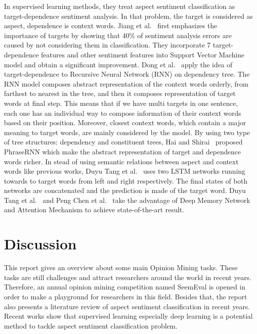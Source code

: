 \documentclass{article}
\begin{document}
In supervised learning methods, they treat aspect sentiment classification as target-dependence sentiment analysis.
In that problem, the target is considered as aspect, dependence is context words.
Jiang et al.~\cite{Jiang:2011:TTS:2002472.2002492} first emphasizes the importance of targets by showing that 40\% of sentiment analysis errors are caused by not considering them in classification.
They incorporate 7 target-dependence features and other sentiment features into Support Vector Machine model and obtain a significant improvement.
Dong et al.~\cite{dong2014adaptive} apply the idea of target-dependence to Recursive Neural Network (RNN) on dependency tree.
The RNN model composes abstract representation of the context words orderly, from farthest to nearest in the tree, and then it composes representation of target words at final step.
This means that if we have multi targets in one sentence, each one has an individual way to compose information of their context words based on their position. 
Moreover, closest context words, which contain a major meaning to target words, are mainly considered by the model.
By using two type of tree structures: dependency and constituent trees, Hai and Shirai~\cite{DBLP:conf/emnlp/NguyenS15} proposed PhraseRNN which make the abstract representation of target and dependence words richer.
In stead of using semantic relations between aspect and context words like previous works, Duyu Tang et al.~\cite{DBLP:journals/corr/TangQFL15} uses two LSTM networks running towards to target words from left and right respectively. 
The final states of both networks are concatenated and the prediction is made of the target word.
Duyu Tang et al.~\cite{DBLP:journals/corr/TangQL16} and Peng Chen et al.~\cite{D17-1048} take the advantage of Deep Memory Network and Attention Mechanism to achieve state-of-the-art result.

\section{Discussion}
\label{sec:disc}
This report gives an overview about some main Opinion Mining tasks.
These tasks are still challenges and attract researchers around the world in recent years.
Therefore, an annual opinion mining competition named SeemEval is opened in order to make a playground for researchers in this field.
Besides that, the report also presents a literature review of aspect sentiment classification in recent years.
Recent works show that supervised learning especially deep learning is a potential method to tackle aspect sentiment classification problem.




\printbibliography

\end{document}

